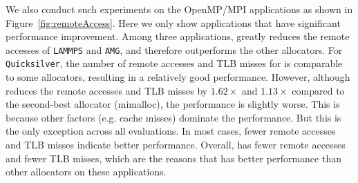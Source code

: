 



We also conduct such experiments on the OpenMP/MPI applications as shown in Figure~\ref{fig:remoteAccess}. Here we only show applications that have significant performance improvement. Among three applications, \NM{} greatly reduces the remote accesses of \texttt{LAMMPS} and \texttt{AMG}, and therefore outperforms the other allocators. For \texttt{Quicksilver}, the number of remote accesses and TLB misses for \NM{} is comparable to some allocators, resulting in a relatively good performance. 
However, although \NM{} reduces the remote accesses and TLB misses by $1.62\times$ and $1.13\times$ compared to the second-best allocator (mimalloc), the performance is slightly worse. This is because other factors (e.g. cache misses) dominate the performance. But this is the only exception across all evaluations. In most cases, fewer remote accesses and TLB misses indicate better performance.
Overall, \NM{} has fewer remote accesses and fewer TLB misses, which are the reasons that \NM{} has better performance than other allocators on these applications. 



